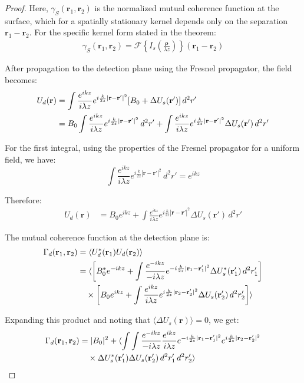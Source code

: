 \documentclass[10pt,a4paper]{amsart}
\begin{document}
\begin{proof}
Here, $\gamma_S(\mathbf{r}_1, \mathbf{r}_2)$ is the normalized mutual coherence function at the surface, which for a spatially stationary kernel depends only on the separation $\mathbf{r}_1 - \mathbf{r}_2$. For the specific kernel form stated in the theorem:
\begin{align}
\gamma_S(\mathbf{r}_1, \mathbf{r}_2) = \mathcal{F}\left\{I_s\left(\frac{\mathbf{\rho}}{\lambda z}\right)\right\}(\mathbf{r}_1 - \mathbf{r}_2)
\end{align}

After propagation to the detection plane using the Fresnel propagator, the field becomes:
\begin{align}
U_d(\mathbf{r}) &= \int \frac{e^{ikz}}{i\lambda z} e^{i\frac{k}{2z}|\mathbf{r} - \mathbf{r}'|^2} [B_0 + \Delta U_s(\mathbf{r}')] \, d^2r' \\
&= B_0 \int \frac{e^{ikz}}{i\lambda z} e^{i\frac{k}{2z}|\mathbf{r} - \mathbf{r}'|^2} \, d^2r' + \int \frac{e^{ikz}}{i\lambda z} e^{i\frac{k}{2z}|\mathbf{r} - \mathbf{r}'|^2} \Delta U_s(\mathbf{r}') \, d^2r' \notag
\end{align}

For the first integral, using the properties of the Fresnel propagator for a uniform field, we have:
\begin{equation}
\int \frac{e^{ikz}}{i\lambda z} e^{i\frac{k}{2z}|\mathbf{r} - \mathbf{r}'|^2} \, d^2r' = e^{ikz}
\end{equation}

Therefore:
\begin{align}
U_d(\mathbf{r}) &= B_0 e^{ikz} + \int \frac{e^{ikz}}{i\lambda z} e^{i\frac{k}{2z}|\mathbf{r} - \mathbf{r}'|^2} \Delta U_s(\mathbf{r}') \, d^2r'
\end{align}

The mutual coherence function at the detection plane is:
\begin{align}
\Gamma_d(\mathbf{r}_1, \mathbf{r}_2) &= \langle U_d^*(\mathbf{r}_1) U_d(\mathbf{r}_2) \rangle \\
&= \langle \left[B_0^* e^{-ikz} + \int \frac{e^{-ikz}}{-i\lambda z} e^{-i\frac{k}{2z}|\mathbf{r}_1 - \mathbf{r}'_1|^2} \Delta U_s^*(\mathbf{r}'_1) \, d^2r'_1 \right] \notag \\
&\quad \times \left[B_0 e^{ikz} + \int \frac{e^{ikz}}{i\lambda z} e^{i\frac{k}{2z}|\mathbf{r}_2 - \mathbf{r}'_2|^2} \Delta U_s(\mathbf{r}'_2) \, d^2r'_2 \right] \rangle \notag
\end{align}

Expanding this product and noting that $\langle \Delta U_s(\mathbf{r}) \rangle = 0$, we get:
\begin{align}
\Gamma_d(\mathbf{r}_1, \mathbf{r}_2) &= |B_0|^2 + \langle \int\int \frac{e^{-ikz}}{-i\lambda z} \frac{e^{ikz}}{i\lambda z} e^{-i\frac{k}{2z}|\mathbf{r}_1 - \mathbf{r}'_1|^2} e^{i\frac{k}{2z}|\mathbf{r}_2 - \mathbf{r}'_2|^2} \\
&\quad \times \Delta U_s^*(\mathbf{r}'_1) \Delta U_s(\mathbf{r}'_2) \, d^2r'_1 \, d^2r'_2 \rangle \notag
\end{align}


\end{proof}
\end{document}
